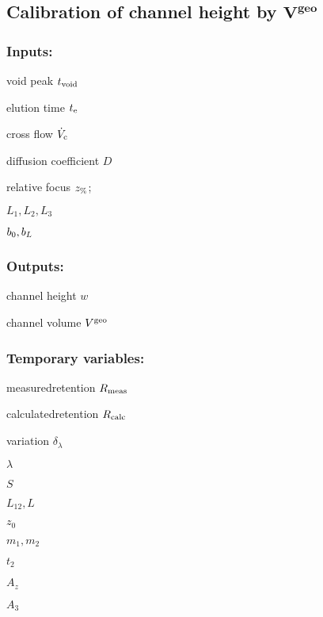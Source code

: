 \subsection*{Calibration of channel height by $\bm{V^{\text{geo}}}$}
\newcommand{\lamMin}{\ensuremath{\lambda_\text{min}}}
\newcommand{\lamMax}{\ensuremath{\lambda_\text{max}}}
\subsubsection*{Inputs:}
\begin{multicols}{3}
  \begin{packed_item}
    \item void peak $t_\text{void}$
    \item elution time $t_\text{e}$
    \item cross flow $\dot{V}_\text{c}$
    \item \small diffusion coefficient \normalsize $D$
    \item relative focus $z_\text{\%}$;
    \item $L_1, L_2, L_3$
    \item $b_0, b_L$
  \end{packed_item}
\end{multicols}

\subsubsection*{Outputs:}
\begin{multicols}{3}
  \begin{packed_item}
    \item channel height $w$ 
    \item channel volume $V^\text{geo}$    
  \end{packed_item}
\end{multicols}

\subsubsection*{Temporary variables:}
\begin{multicols}{3}
  \begin{packed_item}
    \item measured\enspace retention $R_\text{meas}$
    \item calculated\enspace retention $R_\text{calc}$
    \item variation $δ_λ$
    \item $λ$
    \item $S$
    \item $L_{12}, L$
    \item $z_0$
    \item $m_1, m_2$
    \item $t_2$
    \item $A_z$
    \item $A_3$
  \end{packed_item}
\end{multicols}

